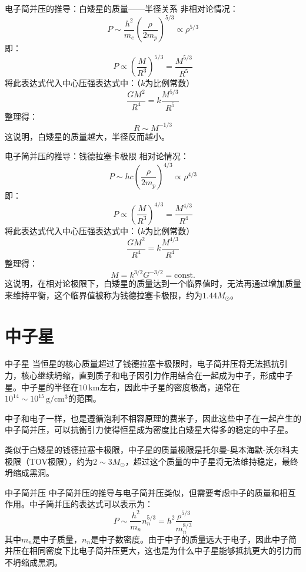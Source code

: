 \documentclass[10pt,aspectratio=1610]{beamer}
\begin{document}
\begin{frame}{电子简并压的推导：白矮星的质量——半径关系}
    非相对论情况：
    \[
        P \sim \frac{h^2}{m_e} \left(\frac{\rho}{2 m_p}\right)^{5/3} \propto \rho^{5/3}
    \]
    即：
    \textcolor{mari}{
    \[
        P \propto \left(\frac{M}{R^3}\right)^{5/3} = \frac{M^{5/3}}{R^5}
    \]
    }
    将此表达式代入中心压强表达式中：（$k$为比例常数）
    \[
        \frac{G M^2}{R^4} = k \frac{M^{5/3}}{R^5}
    \]
    整理得：
    \textcolor{dia}{
    \[
        R \sim M^{-1/3}
    \]
    }
    这说明，白矮星的质量越大，半径反而越小。
\end{frame}

\begin{frame}{电子简并压的推导：钱德拉塞卡极限}
    相对论情况：
    \[
        P \sim h c \left(\frac{\rho}{2 m_p}\right)^{4/3} \propto \rho^{4/3}
    \]
    即：
    \textcolor{mari}{
    \[
        P \propto \left(\frac{M}{R^3}\right)^{4/3} = \frac{M^{4/3}}{R^4}
    \]
    }
    将此表达式代入中心压强表达式中：（$k$为比例常数）
    \[
        \frac{G M^2}{R^4} = k \frac{M^{4/3}}{R^4}
    \]
    整理得：
    \textcolor{dia}{
    \[
        M = k^{3/2} G^{-3/2} = \mathrm{const.}
    \]
    }
    这说明，在相对论极限下，白矮星的质量达到一个临界值时，无法再通过增加质量来维持平衡，这个临界值被称为\textcolor{dia}{钱德拉塞卡极限}，约为\textcolor{dia}{$1.44 M_\odot$}。
\end{frame}

\section{中子星}

\begin{frame}{中子星}
    当恒星的核心质量超过了钱德拉塞卡极限时，电子简并压将无法抵抗引力，核心继续坍缩，直到质子和电子因引力作用结合在一起成为中子，形成\textcolor{dia}{中子星}。中子星的半径在$10\,\mathrm{km}$左右，因此中子星的密度极高，通常在$10^{14} \sim 10^{15}\,\mathrm{g/cm^3}$的范围。

    中子和电子一样，也是遵循泡利不相容原理的费米子，因此这些中子在一起产生的\textcolor{mari}{中子简并压}，可以抗衡引力使得恒星成为密度比白矮星大得多的稳定的中子星。

    类似于白矮星的钱德拉塞卡极限，中子星的质量极限是\textcolor{mari}{托尔曼-奥本海默-沃尔科夫极限（TOV极限），约为$2 \sim 3 M_\odot$}，超过这个质量的中子星将无法维持稳定，最终坍缩成黑洞。
\end{frame}

\begin{frame}{中子简并压}
    中子简并压的推导与电子简并压类似，但需要考虑中子的质量和相互作用。中子简并压的表达式可以表示为：
    \textcolor{mari}{
    \[
        P \sim \frac{h^2}{m_n} n_n^{5/3} = h^2 \frac{\rho^{5/3}}{m_n^{8/3}}
    \]
    }
    其中$m_n$是中子质量，$n_n$是中子数密度。由于中子的质量远大于电子，因此\textcolor{mari}{中子简并压在相同密度下比电子简并压更大}，这也是为什么中子星能够抵抗更大的引力而不坍缩成黑洞。
\end{frame}
\end{document}
